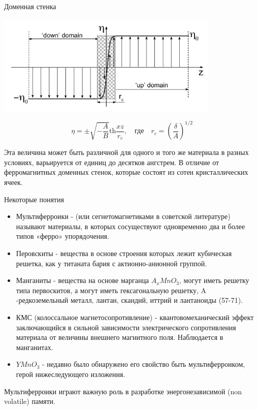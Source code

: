 \documentclass[9pt, compress, xcolor=table]{beamer}
\begin{document}
\begin{frame}{Доменная стенка}
\begin{center}
\includegraphics[width=0.8\textwidth]{shg12}
\end{center}

\begin{equation*}
\eta=\pm \sqrt{-\frac{A}{B}}\text{th}\frac{xz}{r_c},\quad \text{где}\quad r_c = \left(\frac{\delta}{A}\right)^{1/2}
\end{equation*}


Эта величина может быть различной для одного и того же материала в разных условиях, варьируется от единиц до десятков ангстрем. В отличие от ферромагнитных доменных стенок, которые состоят из сотен кристаллических ячеек.

\end{frame}

\begin{frame}{Некоторые понятия}

\begin{itemize}
\item \textcolor{red!50!black}{Мультиферроики} -  (или сегнетомагнетиками в советской литературе) называют материалы, в которых сосуществуют одновременно два и более типов «ферро» упорядочения.

\item \textcolor{red!50!black}{Перовскиты} - вещества в основе строения которых лежит кубическая решетка, как у титаната бария с актионно-анионной группой.

\item \textcolor{red!50!black}{Манганиты} - вещества на основе марганца $A_x Mn O_3$, могут иметь решетку типа первоскитов, а могут иметь гексагональную решетку, A -редкоземельный металл, лантан, скандий, иттрий и лантаноиды (57-71).

\item \textcolor{red!50!black}{КМС (колоссальное магнетосопротивление)} -  квантовомеханический эффект заключающийся в сильной зависимости электрического сопротивления материала от величины внешнего магнитного поля. Наблюдается в манганитах.

\item \textcolor{red!50!black}{$Y Mn O_3$} - недавно было обнаружено его свойство быть мультиферроиком, герой нижеследующего изложения.

\end{itemize}

Мультиферроики играют важную роль в разработке энергонезависимой (non volatile) памяти.

\end{frame}
\end{document}
